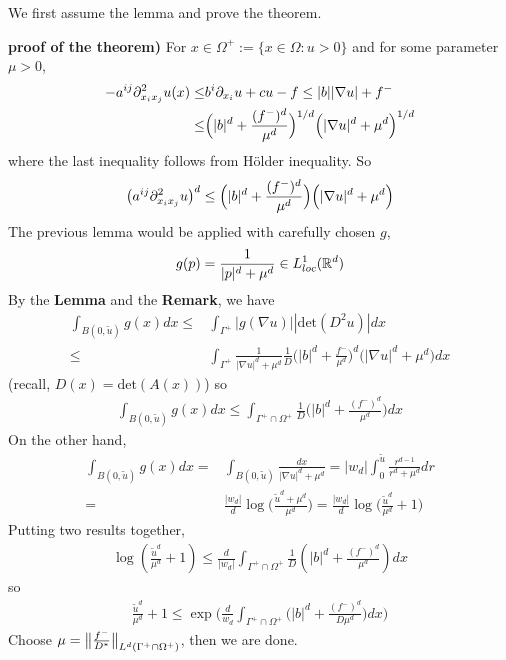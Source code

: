 \documentclass[12pt,a4paper]{article}
\newenvironment{proof}
{\begin{changemargin}{0.5cm}{0.5cm} 
	}%
	{\end{changemargin}
}
\newenvironment{p}
{\begin{proof} 
	}%
	{\end{proof}
}
\begin{document}
We first assume the lemma and prove the theorem.
\begin{p}
\textbf{proof of the theorem)} For $x\in \Omega^+ := \{x\in \Omega : u>0 \}$ and for some parameter $\mu>0$,
\begin{align*}
-a^{ij} \partial^2_{x_i x_j} u(x) \leq & b^i \partial_{x_i} u + cu -f \leq |b| |\nabla u| + f^- \\
\leq & \Big(|b|^d + \frac{(f^-)^d}{\mu^d} \Big)^{1/d} \Big(|\nabla u|^d + \mu^d \Big)^{1/d}
\end{align*}
where the last inequality follows from H\"older inequality. So
\begin{align*}
\big( a^{ij} \partial^2_{x_i x_j} u\big)^d \leq \Big(|b|^d + \frac{(f^-)^d}{\mu^d} \Big) \Big(|\nabla u|^d + \mu^d \Big)
\end{align*}
The previous lemma would be applied with carefully chosen $g$,
\begin{align*}
g(p) = \frac{1}{|p|^d + \mu^d} \in L^1_{loc}(\mathbb{R}^d)
\end{align*}
By the \textbf{Lemma} and the \textbf{Remark}, we have
\begin{align*}
\int_{B(0, \tilde{u})} g(x) dx \leq & \int_{\Gamma^+} |g(\nabla u)||\text{det}(D^2 u)| dx \\
\leq & \int_{\Gamma^+} \frac{1}{|\nabla u|^d + \mu^d} \frac{1}{D} \Big(|b|^d + \frac{f^-}{\mu^d} \Big)^d \Big(|\nabla u|^d + \mu^d \Big) dx
\end{align*}
(recall, $D(x) = \text{det}(A(x))$) so
\begin{align*}
\int_{B(0, \tilde{u})} g(x) dx \leq \int_{\Gamma^+ \cap \Omega^+} \frac{1}{D}  \Big(|b|^d + \frac{(f^-)^d}{\mu^d} \Big)dx
\end{align*}
On the other hand,
\begin{align*}
\int_{B(0, \tilde{u})} g(x) dx = & \int_{B(0, \tilde{u}) }\frac{dx}{|\nabla u|^d + \mu^d} = |w_d| \int_0^{\tilde{u}}\frac{r^{d-1}}{r^d + \mu^d} dr \\
= & \frac{|w_d|}{d} \log \Big(\frac{\tilde{u}^d + \mu^d}{\mu^d} \Big) =\frac{|w_d|}{d} \log \Big( \frac{\tilde{u}^d}{\mu^d} +1 \Big) 
\end{align*}
Putting two results together,
\begin{align*}
\log (\frac{\tilde{u}^d}{\mu^d}+1) \leq \frac{d}{|w_d|} \int_{\Gamma^+ \cap \Omega^+} \frac{1}{D} (|b|^d + \frac{(f^-)^d}{\mu^d}) dx
\end{align*}
so
\begin{align*}
\frac{\tilde{u}^d}{\mu^d}+1 \leq \exp \Big( \frac{d}{w_d} \int_{\Gamma^+ \cap \Omega^+} \big( |b|^d + \frac{(f^-)^d}{D \mu^d} \big)dx\Big)
\end{align*}
Choose $\mu = \bigl\lVert\frac{f^-}{D^*}\bigr\rVert_{L^d(\Gamma^+ \cap \Omega^+)}$, then we are done.

\eop
\end{p}
\s
\end{document}
